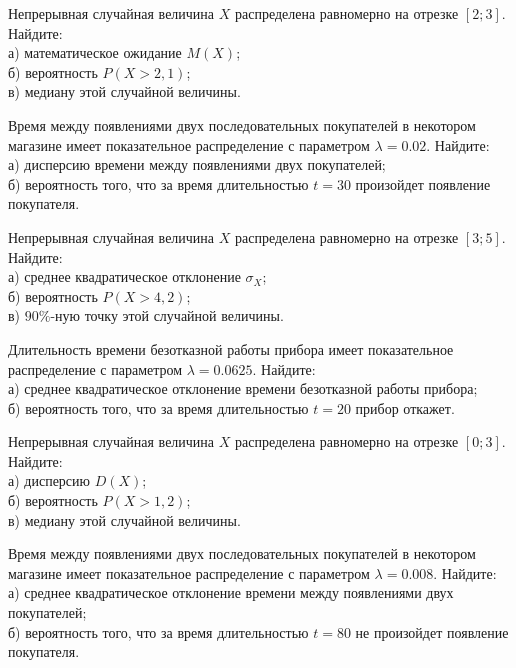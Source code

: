 \vfill

\newpage\setcounter{zad}{0}

\z Непрерывная случайная величина $X$ распределена равномерно на отрезке $[2; 3]$. Найдите: \\ \quad а) математическое ожидание $M(X)$; \\ \quad б) вероятность $P(X>2{,}1)$; \\ \quad в) медиану этой случайной величины.


\vfill

\z Время между появлениями двух последовательных покупателей в некотором магазине имеет показательное распределение с параметром $\lambda = 0.02$. Найдите: \\ \quad а) дисперсию времени между появлениями двух покупателей; \\ \quad б) вероятность того, что за время длительностью $t = 30$  произойдет появление покупателя.
 

\vfill

\newpage\setcounter{zad}{0}

\z Непрерывная случайная величина $X$ распределена равномерно на отрезке $[3; 5]$. Найдите: \\ \quad а) среднее квадратическое отклонение $\sigma_X$; \\ \quad б) вероятность $P(X>4{,}2)$; \\ \quad в) $90\%$-ную точку этой случайной величины.


\vfill

\z Длительность времени безотказной работы прибора имеет показательное распределение с параметром $\lambda = 0.0625$. Найдите: \\ \quad а) среднее квадратическое отклонение времени безотказной работы прибора; \\ \quad б) вероятность того, что за время длительностью $t = 20$ прибор  откажет.
 

\vfill

\newpage\setcounter{zad}{0}

\z Непрерывная случайная величина $X$ распределена равномерно на отрезке $[0; 3]$. Найдите: \\ \quad а) дисперсию $D(X)$; \\ \quad б) вероятность $P(X>1{,}2)$; \\ \quad в) медиану этой случайной величины.


\vfill

\z Время между появлениями двух последовательных покупателей в некотором магазине имеет показательное распределение с параметром $\lambda = 0.008$. Найдите: \\ \quad а) среднее квадратическое отклонение времени между появлениями двух покупателей; \\ \quad б) вероятность того, что за время длительностью $t = 80$ не произойдет появление покупателя.
 

